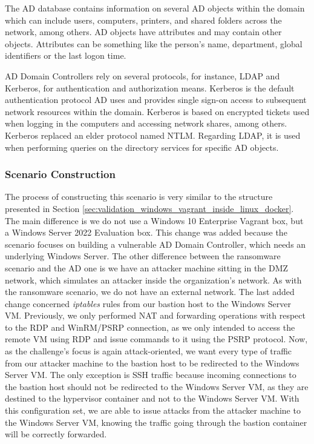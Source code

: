 The AD database contains information on several AD objects within the domain which can include users, computers, printers, and shared folders across the network, among others. AD objects have attributes and may contain other objects. Attributes can be something like the person's name, department, global identifiers or the last logon time.

AD Domain Controllers rely on several protocols, for instance, LDAP and Kerberos, for authentication and authorization means. Kerberos is the default authentication protocol AD uses and provides single sign-on access to subsequent network resources within the domain. Kerberos is based on encrypted tickets used when logging in the computers and accessing network shares, among others. Kerberos replaced an elder protocol named NTLM. Regarding LDAP, it is used when performing queries on the directory services for specific AD objects.

\subsubsection{Scenario Construction} \label{sec:validation_ad_scenario_construction}

The process of constructing this scenario is very similar to the structure presented in Section \ref{sec:validation_windows_vagrant_inside_linux_docker}. The main difference is we do not use a Windows 10 Enterprise Vagrant box, but a Windows Server 2022 Evaluation box. This change was added because the scenario focuses on building a vulnerable AD Domain Controller, which needs an underlying Windows Server. The other difference between the ransomware scenario and the AD one is we have an attacker machine sitting in the DMZ network, which simulates an attacker inside the organization's network. As with the ransomware scenario, we do not have an external network. The last added change concerned \textit{iptables} rules from our bastion host to the Windows Server VM. Previously, we only performed NAT and forwarding operations with respect to the RDP and WinRM/PSRP connection, as we only intended to access the remote VM using RDP and issue commands to it using the PSRP protocol. Now, as the challenge's focus is again attack-oriented, we want every type of traffic from our attacker machine to the bastion host to be redirected to the Windows Server VM. The only exception is SSH traffic because incoming connections to the bastion host should not be redirected to the Windows Server VM, as they are destined to the hypervisor container and not to the Windows Server VM. With this configuration set, we are able to issue attacks from the attacker machine to the Windows Server VM, knowing the traffic going through the bastion container will be correctly forwarded.

